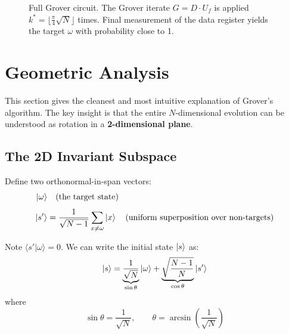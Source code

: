 \documentclass[12pt,a4paper]{article}
\newcommand{\ip}[2]{\langle#1\vert#2\rangle}
\begin{document}
\begin{figure}[H]
\caption{Full Grover circuit. The Grover iterate $G = D\cdot U_f$ is applied $k^* = \lfloor\frac{\pi}{4}\sqrt{N}\rfloor$ times. Final measurement of the data register yields the target $\omega$ with probability close to 1.}
\label{fig:full_circuit}
\end{figure}

\section{Geometric Analysis}
\label{sec:geometry}

This section gives the cleanest and most intuitive explanation of Grover's algorithm. The key insight is that the entire $N$-dimensional evolution can be understood as rotation in a \textbf{2-dimensional plane}.

\subsection{The 2D Invariant Subspace}

Define two orthonormal-in-span vectors:
\begin{align}
  \ket{\omega} &\quad \text{(the target state)} \\[4pt]
  \ket{s'} &= \frac{1}{\sqrt{N-1}}\sum_{x \neq \omega}\ket{x}
              \quad\text{(uniform superposition over non-targets)}
\end{align}

Note $\ip{s'}{\omega} = 0$. We can write the initial state $\ket{s}$ as:
\[
  \ket{s} = \underbrace{\frac{1}{\sqrt{N}}}_{\sin\theta}\ket{\omega}
           + \underbrace{\sqrt{\frac{N-1}{N}}}_{\cos\theta}\ket{s'}
\]
where
\[
  \boxed{\sin\theta = \frac{1}{\sqrt{N}}, \qquad \theta = \arcsin\!\left(\frac{1}{\sqrt{N}}\right)}
\]
\end{document}
